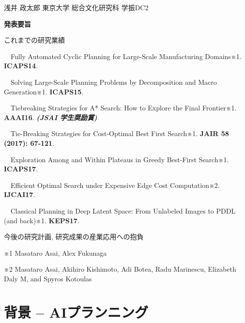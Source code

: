 




\begin{outline-text-1}
\begin{center}
浅井 政太郎 東京大学 総合文化研究科 学振DC2
\end{center}

\textbf{発表要旨}

これまでの研究業績

　Fully Automated Cyclic Planning for Large-Scale Manufacturing Domains※1. \textbf{ICAPS14}.

　Solving Large-Scale Planning Problems by Decomposition and Macro Generation※1. \textbf{ICAPS15}.

　Tiebreaking Strategies for A* Search: How to Explore the Final Frontier※1. \textbf{AAAI16}. \textbf{\emph{(JSAI 学生奨励賞)}}

　Tie-Breaking Strategies for Cost-Optimal Best First Search※1. \textbf{JAIR 58 (2017): 67-121}.

　Exploration Among and Within Plateaus in Greedy Best-First Search※1. \textbf{ICAPS17}.

　Efficient Optimal Search under Expensive Edge Cost Computation※2. \textbf{IJCAI17}.

　Classical Planning in Deep Latent Space: From Unlabeled Images to PDDL (and back)※1. \textbf{KEPS17}.

今後の研究計画, 研究成果の産業応用への抱負

\begin{smaller}
※1 Masataro Asai, Alex Fukunaga

※2 Masataro Asai, Akihiro Kishimoto, Adi Botea, Radu Marinescu, Elizabeth Daly M, and Spyros Kotoulas
\end{smaller}
\end{outline-text-1}

\section{背景 -- AIプランニング}
\label{sec-1}

